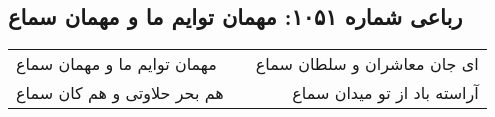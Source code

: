 \begin{center}
\section*{رباعی شماره ۱۰۵۱: مهمان توایم ما و مهمان سماع}
\label{sec:1051}
\begin{longtable}{l p{0.5cm} r}
مهمان توایم ما و مهمان سماع
&&
ای جان معاشران و سلطان سماع
\\
هم بحر حلاوتی و هم کان سماع
&&
آراسته باد از تو میدان سماع
\\
\end{longtable}
\end{center}
